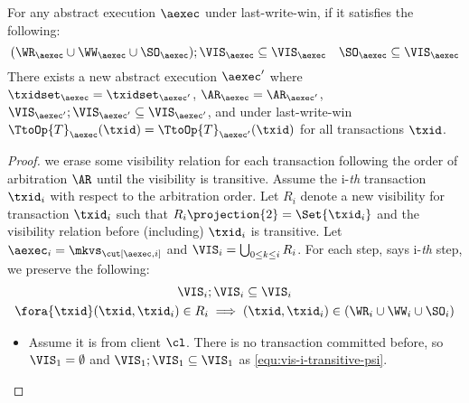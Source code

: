 \begin{lemma}
    \label{lem:aexec-spec-psi}
    For any abstract execution \( \aexec \) under last-write-win, if it satisfies the following:
    \[
        (\WR_\aexec \cup \WW_\aexec \cup \SO_\aexec ) ; \VIS_\aexec \subseteq \VIS_\aexec \quad \SO_\aexec \subseteq \VIS_\aexec
    \]
    There exists a new abstract execution \( \aexec' \) where \( \txidset_\aexec = \txidset_{\aexec'} \), \( \AR_\aexec = \AR_{\aexec'} \),
    \( \VIS_{\aexec'} ; \VIS_{\aexec'} \subseteq \VIS_{\aexec'} \), and
    under last-write-win \( \TtoOp{T}_{\aexec}(\txid) = \TtoOp{T}_{\aexec'}(\txid) \) for all transactions \( \txid \).
\end{lemma}
\begin{proof}
    we erase some visibility relation for each transaction following the order of arbitration \( \AR \) until the visibility is transitive.
    Assume the i-\emph{th} transaction \( \txid_i \)  with respect to the arbitration order.
    Let \( R_i \) denote a new visibility for transaction \( \txid_i \) such that
    \( R_i\projection{2} = \Set{\txid_i}\)
    and the visibility relation before (including) \( \txid_i \) is transitive.
    Let \( \aexec_i = \mkvs_{\cut[\aexec, i]} \) and \( \VIS_i = \bigcup_{0 \leq k \leq i} R_i \).
    For each step, says i-\emph{th} step, we  preserve the following:
    \begin{gather}
        \VIS_i ; \VIS_i \subseteq \VIS_i \label{equ:vis-i-transitive-psi} \\
        \fora{\txid} (\txid,\txid_i) \in R_i \implies (\txid, \txid_i) \in (\WR_i \cup \WW_i \cup \SO_i)
        \label{equ:last-read-correct-psi}
    \end{gather}
    \begin{itemize}
    \item {}
    Assume it is from client \( \cl \).
    There is no transaction committed before, so \( \VIS_1 = \emptyset \) and \( \VIS_1 ; \VIS_1 \subseteq \VIS_1 \) as \cref{equ:vis-i-transitive-psi}.


\end{itemize}
\end{proof}
